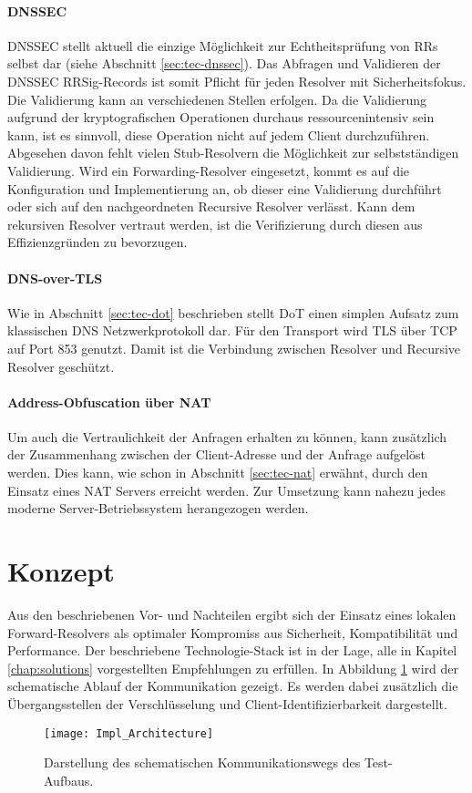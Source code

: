 \paragraph{DNSSEC}
DNSSEC stellt aktuell die einzige Möglichkeit zur Echtheitsprüfung von RRs selbst dar (siehe Abschnitt \ref{sec:tec-dnssec}). Das Abfragen und Validieren der \ac{DNSSEC} RRSig-Records ist somit Pflicht für jeden Resolver mit Sicherheitsfokus. Die Validierung kann an verschiedenen Stellen erfolgen. Da die Validierung aufgrund der kryptografischen Operationen durchaus ressourcenintensiv sein kann, ist es sinnvoll, diese Operation nicht auf jedem Client durchzuführen. Abgesehen davon fehlt vielen Stub-Resolvern die Möglichkeit zur selbstständigen Validierung. Wird ein Forwarding-Resolver eingesetzt, kommt es auf die Konfiguration und Implementierung an, ob dieser eine Validierung durchführt oder sich auf den nachgeordneten Recursive Resolver verlässt. Kann dem rekursiven Resolver vertraut werden, ist die Verifizierung durch diesen aus Effizienzgründen zu bevorzugen.

\paragraph{DNS-over-TLS}
Wie in Abschnitt \ref{sec:tec-dot} beschrieben stellt DoT einen simplen Aufsatz zum klassischen DNS Netzwerkprotokoll dar. Für den Transport wird TLS über TCP auf Port 853 genutzt\cite{rfc7858}. Damit ist die Verbindung zwischen Resolver und Recursive Resolver geschützt. 

\paragraph{Address-Obfuscation über NAT}
Um auch die Vertraulichkeit der Anfragen erhalten zu können, kann zusätzlich der Zusammenhang zwischen der Client-Adresse und der Anfrage aufgelöst werden. Dies kann, wie schon in Abschnitt \ref{sec:tec-nat} erwähnt, durch den Einsatz eines NAT Servers erreicht werden. Zur Umsetzung kann nahezu jedes moderne Server-Betriebssystem herangezogen werden.

\section{Konzept}
Aus den beschriebenen Vor- und Nachteilen ergibt sich der Einsatz eines lokalen Forward-Resolvers als optimaler Kompromiss aus Sicherheit, Kompatibilität und Performance. Der beschriebene Technologie-Stack ist in der Lage, alle in Kapitel \ref{chap:solutions} vorgestellten Empfehlungen zu erfüllen. In Abbildung \ref{img:impl-architecture} wird der schematische Ablauf der Kommunikation gezeigt. Es werden dabei zusätzlich die Übergangsstellen der Verschlüsselung und Client-Identifizierbarkeit dargestellt.
\begin{figure}[hb]
    \centering
    \texttt{[image: Impl\_Architecture]}
    \caption{Darstellung des schematischen Kommunikationswegs des Test-Aufbaus.}
    \label{img:impl-architecture}
\end{figure}

